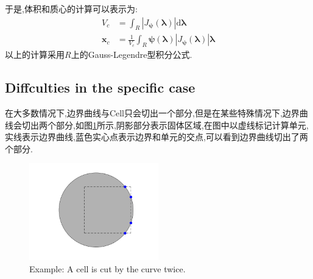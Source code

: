 \documentclass[12pt,halfline,a4paper]{ouparticle}
\begin{document}
\newline 
于是,体积和质心的计算可以表示为:
\begin{equation}\label{eq:volume_centorid}
\begin{aligned}
    V_{c} &= \int_{R} |J_{\boldsymbol{\psi}}(\boldsymbol{\lambda})| \mathrm{d} \boldsymbol{\lambda}\\
    \boldsymbol{x}_{c} &= \frac{1}{V_{c}} \int_{R} \boldsymbol{\psi}(\boldsymbol{\lambda}) |J_{\boldsymbol{\psi}}(\boldsymbol{\lambda})|\boldsymbol{\lambda}
\end{aligned}
\end{equation}
以上的计算采用$R$上的Gauss-Legendre型积分公式.

\subsection{Diffculties in the specific case}
在大多数情况下,边界曲线与Cell只会切出一个部分,但是在某些特殊情况下,边界曲线会切出两个部分,如图\ref{fig:cut_cell_example}所示,阴影部分表示固体区域,在图中以虚线标记计算单元,实线表示边界曲线,蓝色实心点表示边界和单元的交点,可以看到边界曲线切出了两个部分.



\begin{figure}[h]
    \centering
    \includegraphics[width=0.5\textwidth]{figure/cut_cell_example.png}
    \caption{Example: A cell is cut by the curve twice.}
    \label{fig:cut_cell_example}
\end{figure}



\newpage


\end{document}
